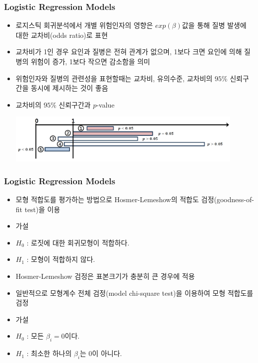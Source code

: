 \documentclass[10pt,xcolor={svgnames},t]{beamer}
\begin{document}
%
%
\begin{frame}
	\frametitle{Logistic Regression Models}
	
	\begin{itemize}
		\item 로지스틱 회귀분석에서 개별 위험인자의 영향은 $exp(\beta)$값을 통해 질병 발생에 대한 교차비(odds ratio)로 표현
\bigskip
\item 교차비가 1인 경우 요인과 질병은 전혀 관계가 없으며, 1보다 크면 요인에 의해 질병의 위험이 증가, 1보다 작으면 감소함을 의미
\bigskip
\item 위험인자와 질병의 관련성을 표현할때는 교차비, 유의수준, 교차비의 $95\%$ 신뢰구간을 동시에 제시하는 것이 좋음
\bigskip
\item 교차비의 $95\%$ 신뢰구간과 $p$-value
				\begin{center}
					\includegraphics[width=0.9\textwidth]{lo8.jpg}
				\end{center}
	\end{itemize}
	
	
\end{frame}
%
%
\begin{frame}
	\frametitle{Logistic Regression Models}
	
	\begin{itemize}
		\item 모형 적합도를 평가하는 방법으로 Hosmer-Lemeshow의 적합도 검정(goodness-of-fit test)을 이용
		\bigskip
		\item 가설
		\item[] $H_0$ : 로짓에 대한 회귀모형이 적합하다.
		\item[] $H_1$ : 모형이 적합하지 않다.
		\bigskip
		\item Hosmer-Lemeshow 검정은 표본크기가 충분히 큰 경우에 적용
		\bigskip 
		\item 일반적으로 모형계수 전체 검정(model chi-square test)을 이용하여 모형 적합도를 검정
		\bigskip
				\item 가설
				\item[] $H_0$ : 모든 $\beta_i =0$이다.
				\item[] $H_1$ : 최소한 하나의 $\beta_i$는 $0$이 아니다.
	\end{itemize}
	
	
\end{frame}
\end{document}

